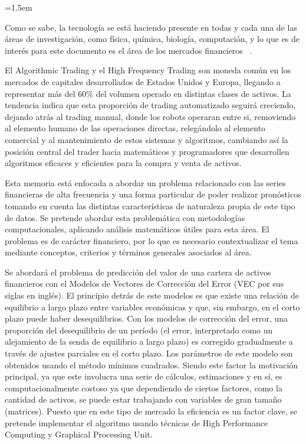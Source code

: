 \parindent=1.5em

Como se sabe, la tecnología se está haciendo presente en todas y cada una de
las áreas de investigación, como física, química, biología, computación, y lo
que es de interés para este documento es el área de los mercados financieros
~\citep{watsham1997quantitative}.

El Algorithmic Trading y el High Frequency Trading son moneda común en los
mercados de capitales desarrollados de Estados Unidos y Europa, llegando a
representar más del 60\% del volumen operado en distintas clases de activos. La
tendencia indica que esta proporción de trading automatizado seguirá creciendo,
dejando atrás al trading manual, donde los robots operaran entre si, removiendo
al elemento humano de las operaciones directas, relegándolo al elemento
comercial y al mantenimiento de estos sistemas y algoritmos, cambiando así la
posición central del trader hacia matemáticos y programadores que desarrollen
algoritmos eficaces y eficientes para la compra y venta de activos.

Esta memoria está enfocada a abordar un problema relacionado con las series
financieras de alta frecuencia y una forma particular de poder realizar
pronósticos tomando en cuenta las distintas características de naturaleza
propia de este tipo de datos. Se pretende abordar esta problemática con
metodologías computacionales, aplicando análisis matemáticos útiles para esta
área. El problema es de carácter financiero, por lo que es necesario
contextualizar el tema mediante conceptos, criterios y términos generales
asociados al área.

Se abordará el problema de predicción del valor de una cartera de activos
financieros con el Modelos de Vectores de Corrección del Error (VEC por sus
siglas en inglés). El principio detrás de este modelos es que existe una
relación de equilibrio a largo plazo entre variables económicas y que, sin
embargo, en el corto plazo puede haber desequilibrios. Con los modelos de
corrección del error, una proporción del desequilibrio de un período (el error,
interpretado como un alejamiento de la senda de equilibrio a largo plazo) es
corregido gradualmente a través de ajustes parciales en el corto plazo.  Los
parámetros de este modelo son obtenidos usando el método mínimos cuadrados.
Siendo este factor la motivación principal, ya que este involucra una serie de
cálculos, estimaciones y en sí, es computacionalmente costoso ya que
dependiendo de ciertos factores, como la cantidad de activos, se puede estar
trabajando con variables de gran tamaño (matrices). Puesto que en este tipo de
mercado la eficiencia es un factor clave, se pretende implementar el algoritmo
usando técnicas de High Performance Computing y Graphical Processing Unit.


